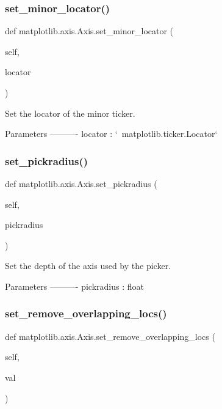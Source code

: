 \subsubsection{\texorpdfstring{set\+\_\+minor\+\_\+locator()}{set\_minor\_locator()}}
{\footnotesize\ttfamily def matplotlib.\+axis.\+Axis.\+set\+\_\+minor\+\_\+locator (\begin{DoxyParamCaption}\item[{}]{self,  }\item[{}]{locator }\end{DoxyParamCaption})}

\begin{DoxyVerb}Set the locator of the minor ticker.

Parameters
----------
locator : `~matplotlib.ticker.Locator`
\end{DoxyVerb}
 \mbox{\label{classmatplotlib_1_1axis_1_1Axis_a356334b77e5effa0a6c3e65a223e3274}} 
\subsubsection{\texorpdfstring{set\+\_\+pickradius()}{set\_pickradius()}}
{\footnotesize\ttfamily def matplotlib.\+axis.\+Axis.\+set\+\_\+pickradius (\begin{DoxyParamCaption}\item[{}]{self,  }\item[{}]{pickradius }\end{DoxyParamCaption})}

\begin{DoxyVerb}Set the depth of the axis used by the picker.

Parameters
----------
pickradius :  float
\end{DoxyVerb}
 \mbox{\label{classmatplotlib_1_1axis_1_1Axis_a6443233ee004b4c4b96cad7da318d81a}} 
\subsubsection{\texorpdfstring{set\+\_\+remove\+\_\+overlapping\+\_\+locs()}{set\_remove\_overlapping\_locs()}}
{\footnotesize\ttfamily def matplotlib.\+axis.\+Axis.\+set\+\_\+remove\+\_\+overlapping\+\_\+locs (\begin{DoxyParamCaption}\item[{}]{self,  }\item[{}]{val }\end{DoxyParamCaption})}

